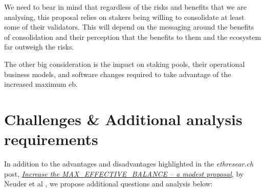 \documentclass[UTF8]{article}
\begin{document}
We need to bear in mind that regardless of the risks and benefits that we are analysing, this proposal relies on stakers being willing to consolidate at least some of their validators. This will depend on the messaging around the benefits of consolidation and their perception that the benefits to them and the ecosystem far outweigh the risks.

The other big consideration is the impact on staking pools, their operational business models, and software changes required to take advantage of the increased maximum \gls{eb}.


\section{Challenges \& Additional analysis requirements}
\label{sec:challenges}
In addition to the advantages and disadvantages highlighted in the \textit{ethresear.ch} post, \href{https://ethresear.ch/t/increase-the-max-effective-balance-a-modest-proposal/15801/3}{\textit{Increase the MAX\_EFFECTIVE\_BALANCE – a modest proposal}}, by  Neuder et al  \cite{Neuder2023a}, we propose additional questions and analysis below:
\end{document}
